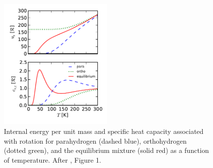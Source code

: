 \documentclass[apj]{emulateapj}
\newcommand{\delad}{\nabla_{\rm ad}}
\begin{document}



\begin{figure}[h]
\centering
\includegraphics[width=0.5\textwidth]{../../figs/ModelAtmospheres/RadSelfGravRealEOS/PaperFigs/ortho_para_energy.pdf}
\caption{Internal energy per unit mass and specific heat capacity associated with rotation for parahydrogen (dashed blue), orthohydrogen (dotted green), and the equilibrium mixture (solid red) as a function of temperature. After \citet{farkas35}, Figure 1.}
\label{fig:ucvr}
\end{figure}


\end{document}
